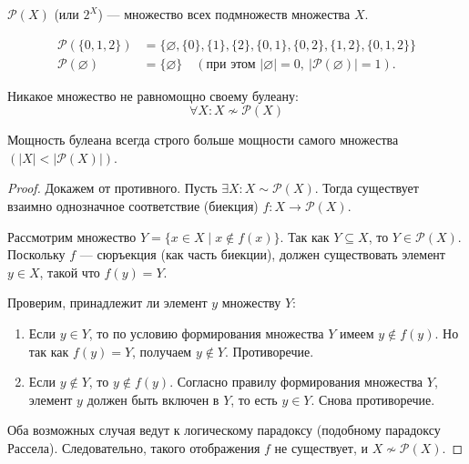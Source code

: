 \begin{definition}
     \(\mathcal{P}(X)\) (или \(2^X\)) --- множество всех
    подмножеств множества \(X\).
\end{definition}

\begin{example}
    \begin{align*}
        \mathcal{P}(\{0, 1, 2\}) &= \{\varnothing, \{0\}, \{1\},
            \{2\}, \{0, 1\}, \{0, 2\}, \{1, 2\}, \{0, 1, 2\}\} \\
        \mathcal{P}(\varnothing) &= \{\varnothing\} \quad (\text{при этом }
            |\varnothing| = 0, \ |\mathcal{P}(\varnothing)| = 1).
    \end{align*}
\end{example}

\begin{theorem}
    Никакое множество не равномощно своему булеану:
    \[
        \forall X: X \nsim \mathcal{P}(X)
    \]
\end{theorem}

\begin{corollary}
    Мощность булеана всегда строго больше мощности самого множества \((|X| < |\mathcal{P}(X)|)\).
\end{corollary}

\begin{proof}
    Докажем от противного. Пусть \(\exists X: X \sim \mathcal{P}(X)\). Тогда существует
    взаимно однозначное соответствие (биекция) \(f: X \to \mathcal{P}(X)\).
    
    Рассмотрим множество \(Y = \{x \in X \mid x \notin f(x)\}\). Так как \(Y \subseteq X\), то \(Y \in \mathcal{P}(X)\). Поскольку \(f\) --- сюръекция (как часть биекции), должен существовать элемент \(y \in X\), такой что \(f(y) = Y\).
    
    Проверим, принадлежит ли элемент \(y\) множеству \(Y\):
    \begin{enumerate}
        \item Если \(y \in Y\), то по условию формирования множества \(Y\) имеем \(y \notin f(y)\). Но так как \(f(y) = Y\), получаем \(y \notin Y\). Противоречие.
        \item Если \(y \notin Y\), то \(y \notin f(y)\). Согласно правилу формирования множества \(Y\), элемент \(y\) должен быть включен в \(Y\), то есть \(y \in Y\). Снова противоречие.
    \end{enumerate}
    Оба возможных случая ведут к логическому парадоксу (подобному парадоксу Рассела). Следовательно, такого отображения \(f\) не существует, и \(X \nsim \mathcal{P}(X)\).
\end{proof}


